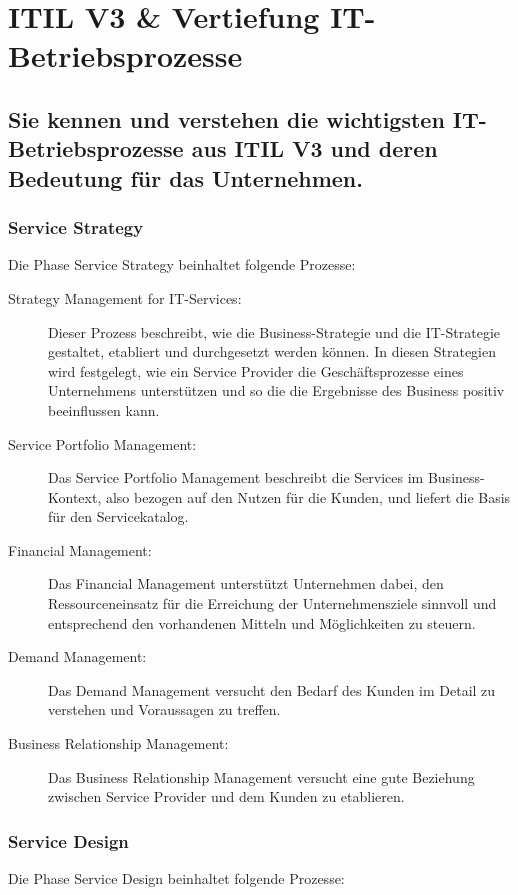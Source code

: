 \chapter{ITIL V3 \& Vertiefung IT-Betriebsprozesse}

\section{Sie kennen und verstehen die wichtigsten IT-Betriebsprozesse aus ITIL V3 und deren Bedeutung für das Unternehmen.}

\subsection{Service Strategy}

Die Phase Service Strategy beinhaltet folgende Prozesse:

\begin{description}
	\item[Strategy Management for IT-Services:] Dieser Prozess beschreibt, wie die Business-Strategie und die IT-Strategie gestaltet, etabliert und durchgesetzt werden können. In diesen Strategien wird festgelegt, wie ein Service Provider die Geschäftsprozesse eines Unternehmens unterstützen und so die die Ergebnisse des Business positiv beeinflussen kann.
	\item[Service Portfolio Management:] Das Service Portfolio Management beschreibt die Services im Business-Kontext, also bezogen auf den Nutzen für die Kunden, und liefert die Basis für den Servicekatalog.
	\item[Financial Management:] Das Financial Management unterstützt Unternehmen dabei, den Ressourceneinsatz für die Erreichung der Unternehmensziele sinnvoll und entsprechend den vorhandenen Mitteln und Möglichkeiten zu steuern.
	\item[Demand Management:] Das Demand Management versucht den Bedarf des Kunden im Detail zu verstehen und Voraussagen zu treffen.
	\item[Business Relationship Management:] Das Business Relationship Management versucht eine gute Beziehung zwischen Service Provider und dem Kunden zu etablieren.
\end{description}

\subsection{Service Design}

Die Phase Service Design beinhaltet folgende Prozesse:

